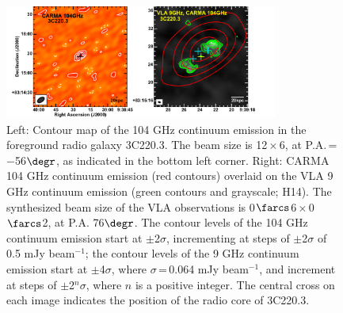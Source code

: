 \documentclass[twocolumn,apj,numberedappendix]{emulateapj}
\newcommand{\CO}{\mbox{CO($J$\,=\,3\,$\rightarrow$\,2) }}
\newcommand{\pmOne}{\mbox{$^{-1}$}}
\begin{document}
\begin{figure}[tbph]
\centering
\includegraphics[width=0.80\textwidth]{Figure/ContPanel.pdf}
\caption{Left: Contour map of the 104 GHz continuum emission in the foreground radio galaxy 3C220.3.
The beam size is 12\,$\times$\,6, at P.A.\,=\,
$-$56$\degr$, as indicated in the bottom left corner. Right: CARMA 104 GHz continuum emission (red contours) overlaid on the VLA 9 GHz continuum emission (green contours and grayscale; H14).
The synthesized beam size of the VLA observations is 0$\farcs$6\,$\times$\,0$\farcs$2, at P.A.
76$\degr$. The contour levels of the 104 GHz continuum emission start at $\pm$2$\sigma$, incrementing at steps
of $\pm$2$\sigma$ of 0.5 mJy beam\pmOne; the contour levels of the 9 GHz continuum
emission start at $\pm$4$\sigma$, where $\sigma$\,=\,0.064 mJy beam\pmOne, and increment at steps of $\pm$2$^n\sigma$,
where $n$ is a positive integer.
The central cross on each image indicates the position of the radio core of 3C220.3. \label{fig:cont}}
\end{figure}
\end{document}
